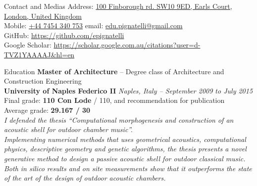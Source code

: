 \documentclass{resume}
\begin{document}
\begin{rSection}{Contact and Medias}
Address: \href{https://goo.gl/maps/Gwa9BTP2ARx}{100 Finborough rd. SW10 9ED, Earls Court, London, United Kingdom} \\
Mobile: \href{tel:07454340753}{+44 7454 340 753} \quad \quad \quad \quad \quad \quad \quad email: \href{mailto:edu.pignatelli@gmail.com}{edu.pignatelli@gmail.com} \\
GitHub: \href{https://github.com/epignatelli}{https://github.com/epignatelli} \\
Google Scholar: \href{https://scholar.google.com.au/citations?user=d-TVZ1YAAAAJ\&hl=en}{https://scholar.google.com.au/citations?user=d-TVZ1YAAAAJ\&hl=en}
\end{rSection}

\begin{rSection}{Education}
\textbf{Master of Architecture} – Degree class of Architecture and Construction Engineering \\
\textbf{University of Naples Federico II} \hfill \textit{Naples, Italy – September 2009 to July 2015} \\
Final grade: \textbf{110 Con Lode} / 110, and recommendation for publication \\
Average grade: \textbf{29.167 / 30}
\vspace{0.5em} \\
\textit{I defended the thesis “Computational morphogenesis and construction of an acoustic shell for outdoor chamber music”. \\Implementing numerical methods that uses geometrical acoustics, computational physics, descriptive geometry and genetic algorithms, the thesis presents a novel generative method to design a passive acoustic shell for outdoor classical music. Both in silico results and on site measurements show that it outperforms the state of the art of the design of outdoor acoustic chambers.}
\end{rSection}
\end{document}
